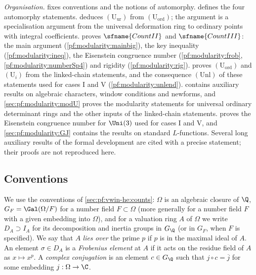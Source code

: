 \emph{Organisation.}  fixes conventions and the notions of automorphy.
 defines the four automorphy statements.  deduces
$(\mathrm{U}_{\mathrm{ur}})$ from $(\mathrm{U}_{\mathrm{ord}})$; the argument is a specialisation argument from the
universal deformation ring to ordinary points with integral coefficients.  proves
$\sfname{CountII}$ and $\sfname{CountIII}$: the main argument (\cref{pf:modularity:mainbig}), the key inequality
(\cref{pf:modularity:ineq}), the Eisenstein congruence number (\cref{pf:modularity:frob},
\cref{pf:modularity:numberSp4}) and rigidity (\cref{pf:modularity:rig}).  proves
$(\mathrm{U}_{\mathrm{ord}})$ and $(\mathrm{U}_i)$ from the linked-chain statements, and the consequence $(\mathrm{Unl})$ of
these statements used for cases I and V (\cref{pf:modularity:unlend}).  contains auxiliary
results on algebraic characters, window conditions and newforms, and \cref{sec:pf:modularity:modU} proves the modularity
statements for universal ordinary determinant rings and the other inputs of the linked-chain statements.
 proves the
Eisenstein congruence number for $\Uni(3)$ used for cases I and V, and \cref{sec:pf:modularity:GJ}
contains the results on standard $L$-functions. Several long auxiliary results of the formal development are cited
with a precise statement; their proofs are not reproduced here.

\subsection{Conventions}\label{sec:pf:modularity:conv}

We use the conventions of \cref{sec:pf:vwin-he:counts}: $\Omega$ is an algebraic closure of $\Q$, $G_F=\Gal(\Omega/F)$
for a number field $F\subset\Omega$ (more generally for a number field $F$ with a given embedding into $\Omega$), and
for a valuation ring $A$ of $\Omega$ we write $D_A\supset I_A$ for its decomposition and inertia groups in $G_\Q$ (or
in $G_F$, when $F$ is specified). We say that $A$ \emph{lies over} the prime $p$ if $p$ is in the maximal ideal of $A$.
An element $\sigma\in D_A$ is a \emph{Frobenius element} at $A$ if it acts on the residue field of $A$ as $x\mapsto x^p$.
A \emph{complex conjugation} is an element $c\in G_\Q$ such that $j\circ c=\overline{j}$ for some embedding
$j:\Omega\to\C$.

